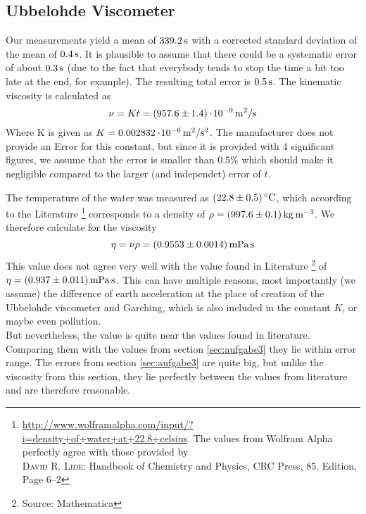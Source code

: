 \subsection{Ubbelohde Viscometer} \label{sec:aufgabe1}
Our measurements yield a mean of $\unit[339.2]{s}$ with a corrected standard deviation of the mean of $\unit[0.4]{s}$. It is plausible to assume that there could be a systematic error of about $\unit[0.3]{s}$ (due to the fact that everybody tends to stop the time a bit too late at the end, for example). The resulting total error is $\unit[0.5]{s}$. The kinematic viscosity is calculated as
\[
    \nu = K t = \unit[(957.6 \pm 1.4)\e{-9}]{m^2/s}
\]
Where K is given as $K = \unit[0.002832\e{-6}]{m^2/s^2}$. The manufacturer does not provide an Error for this constant, but since it is provided with 4 significant figures, we assume that the error is smaller than $0.5\%$ which should make it negligible compared to the larger (and independet) error of $t$.

The temperature of the water was measured as $(22.8 \pm 0.5)\C$, which according to the Literature%
\footnote{\url{http://www.wolframalpha.com/input/?i=density+of+water+at+22.8+celsius}. The values from Wolfram Alpha perfectly agree with those provided by \\ \textsc{David R. Lide}: Handbook of Chemistry and Physics, CRC Press, 85. Edition, Page 6--2}
corresponds to a density of $\rho = \unit[(997.6 \pm 0.1)]{kg\,m^{-3}}$. We therefore calculate for the viscosity
\[
    \eta =  \nu \rho = \unit[(0.9553 \pm0.0014)]{mPa\,s}
\]
This value does not agree very well with the value found in Literature%
\footnote{Source: Mathematica}
of $\eta = \unit[(0.937 \pm 0.011)]{mPa\, s}$. This can have multiple reasons, most importantly (we assume) the difference of earth acceleration at the place of creation of the Ubbelohde viscometer and Garching, which is also included in the constant $K$, or maybe even pollution.\\
But nevertheless, the value is quite near the values found in literature. Comparing them with the values from section \ref{sec:aufgabe3} they lie within error range. The errors from section \ref{sec:aufgabe3} are quite big, but unlike the viscosity from this section, they lie perfectly between the values from literature and are therefore reasonable.
